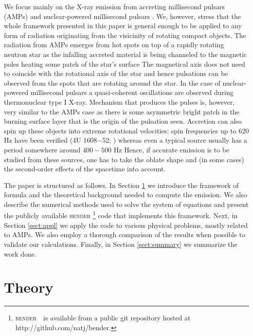 \documentclass[iop, usenatbib]{emulateapj}
\begin{document}
We focus mainly on the X-ray emission from accreting millisecond pulsars (AMPs) \citep{WvdK98, PW12} and nuclear-powered millisecond pulsars \citep{Watts12}.
We, however, stress that the whole framework presented in this paper is general enough to be applied to any form of radiation originating from the visicinity of rotating compact objects. 
The radiation from AMPs  emerges from hot spots on top of a rapidly rotating neutron star as the infalling accreted material is being channeled to the magnetic poles heating some patch of the star's surface
The magnetical axis does not need to coincide with the rotational axis of the star and hence pulsations can be observed from the spots that are rotating around the star.
In the case of nuclear-powered millisecond pulsars a quasi-coherent oscillations are observed during thermonuclear type I X-ray.
Mechanism that produces the pulses is, however, very similar to the AMPs case as there is some asymmetric bright patch in the burning surface layer that is the origin of the pulsation seen.
Accretion can also spin up these objects into extreme rotational velocities: spin frequencies up to 620 Hz have been verified (4U 1608$-$52; \citealt{MC02}) whereas even a typical source usually has a period somewhere around $400-500$ Hz \citep{Watts12, PTR14}
Hence, if accurate emission is to be studied from these sources, one has to take the oblate shape and (in some cases) the second-order effects of the spacetime into account.

The paper is structured as follows.
In Section \ref{sect:theory} we introduce the framework of formula and the theoretical background needed to compute the emission.
We also describe the numerical methods used to solve the system of equations and present the publicly available \textsc{bender}%
\footnote{\textsc{bender}~ is available from a public git repository hosted at http://github.com/natj/bender.}
code that implements this framework.
Next, in Section \ref{sect:appl} we apply the code to various physical problems, mostly related to AMPs.
We also employ a thorough comparison of the results when possible to validate our calculations.
Finally, in Section \ref{sect:summary} we summarize the work done.




\section{Theory}\label{sect:theory}
\end{document}
